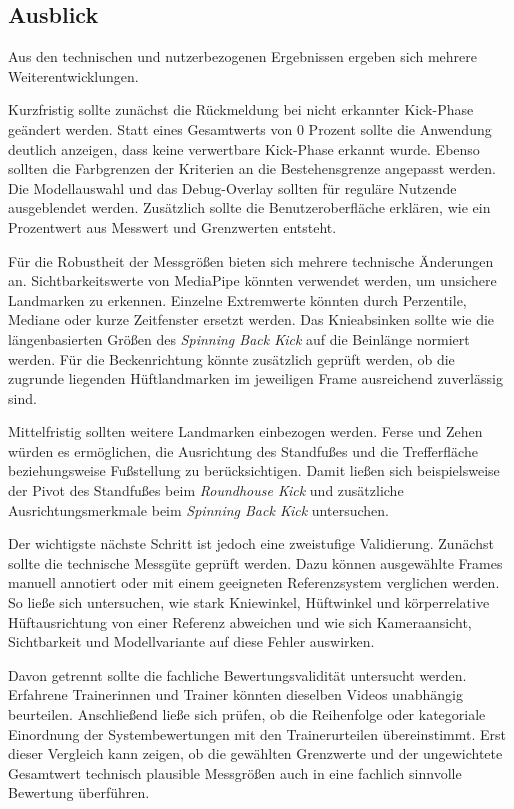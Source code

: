 \documentclass[intern]{cgMA}
\begin{document}
\subsection{Ausblick}
\label{sec:ausblick}
Aus den technischen und nutzerbezogenen Ergebnissen ergeben sich mehrere Weiterentwicklungen.

Kurzfristig sollte zunächst die Rückmeldung bei nicht erkannter Kick-Phase geändert werden. Statt eines Gesamtwerts von 0 Prozent sollte die Anwendung deutlich anzeigen, dass keine verwertbare Kick-Phase erkannt wurde. Ebenso sollten die Farbgrenzen der Kriterien an die Bestehensgrenze angepasst werden. Die Modellauswahl und das Debug-Overlay sollten für reguläre Nutzende ausgeblendet werden. Zusätzlich sollte die Benutzeroberfläche erklären, wie ein Prozentwert aus Messwert und Grenzwerten entsteht.

Für die Robustheit der Messgrößen bieten sich mehrere technische Änderungen an. Sichtbarkeitswerte von MediaPipe könnten verwendet werden, um unsichere Landmarken zu erkennen. Einzelne Extremwerte könnten durch Perzentile, Mediane oder kurze Zeitfenster ersetzt werden. Das Knieabsinken sollte wie die längenbasierten Größen des \textit{Spinning Back Kick} auf die Beinlänge normiert werden. Für die Beckenrichtung könnte zusätzlich geprüft werden, ob die zugrunde liegenden Hüftlandmarken im jeweiligen Frame ausreichend zuverlässig sind.

Mittelfristig sollten weitere Landmarken einbezogen werden. Ferse und Zehen würden es ermöglichen, die Ausrichtung des Standfußes und die Trefferfläche beziehungsweise Fußstellung zu berücksichtigen. Damit ließen sich beispielsweise der Pivot des Standfußes beim \textit{Roundhouse Kick} und zusätzliche Ausrichtungsmerkmale beim \textit{Spinning Back Kick} untersuchen.

Der wichtigste nächste Schritt ist jedoch eine zweistufige Validierung. Zunächst sollte die technische Messgüte geprüft werden. Dazu können ausgewählte Frames manuell annotiert oder mit einem geeigneten Referenzsystem verglichen werden. So ließe sich untersuchen, wie stark Kniewinkel, Hüftwinkel und körperrelative Hüftausrichtung von einer Referenz abweichen und wie sich Kameraansicht, Sichtbarkeit und Modellvariante auf diese Fehler auswirken.

Davon getrennt sollte die fachliche Bewertungsvalidität untersucht werden. Erfahrene Trainerinnen und Trainer könnten dieselben Videos unabhängig beurteilen. Anschließend ließe sich prüfen, ob die Reihenfolge oder kategoriale Einordnung der Systembewertungen mit den Trainerurteilen übereinstimmt. Erst dieser Vergleich kann zeigen, ob die gewählten Grenzwerte und der ungewichtete Gesamtwert technisch plausible Messgrößen auch in eine fachlich sinnvolle Bewertung überführen.
\end{document}
